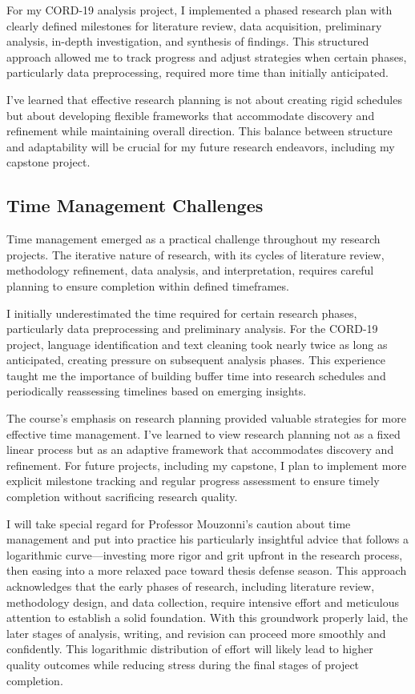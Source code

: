 \documentclass[
]{article}
\begin{document}
For my CORD-19 analysis project, I implemented a phased research plan
with clearly defined milestones for literature review, data acquisition,
preliminary analysis, in-depth investigation, and synthesis of findings.
This structured approach allowed me to track progress and adjust
strategies when certain phases, particularly data preprocessing,
required more time than initially anticipated.

I've learned that effective research planning is not about creating
rigid schedules but about developing flexible frameworks that
accommodate discovery and refinement while maintaining overall
direction. This balance between structure and adaptability will be
crucial for my future research endeavors, including my capstone project.

\subsection{Time Management
Challenges}\label{time-management-challenges}

Time management emerged as a practical challenge throughout my research
projects. The iterative nature of research, with its cycles of
literature review, methodology refinement, data analysis, and
interpretation, requires careful planning to ensure completion within
defined timeframes.

I initially underestimated the time required for certain research
phases, particularly data preprocessing and preliminary analysis. For
the CORD-19 project, language identification and text cleaning took
nearly twice as long as anticipated, creating pressure on subsequent
analysis phases. This experience taught me the importance of building
buffer time into research schedules and periodically reassessing
timelines based on emerging insights.

The course's emphasis on research planning provided valuable strategies
for more effective time management. I've learned to view research
planning not as a fixed linear process but as an adaptive framework that
accommodates discovery and refinement. For future projects, including my
capstone, I plan to implement more explicit milestone tracking and
regular progress assessment to ensure timely completion without
sacrificing research quality.

I will take special regard for Professor Mouzonni's caution about time
management and put into practice his particularly insightful advice that
follows a logarithmic curve---investing more rigor and grit upfront in
the research process, then easing into a more relaxed pace toward thesis
defense season. This approach acknowledges that the early phases of
research, including literature review, methodology design, and data
collection, require intensive effort and meticulous attention to
establish a solid foundation. With this groundwork properly laid, the
later stages of analysis, writing, and revision can proceed more
smoothly and confidently. This logarithmic distribution of effort will
likely lead to higher quality outcomes while reducing stress during the
final stages of project completion.
\end{document}
